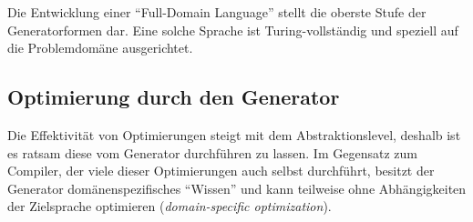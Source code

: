 Die Entwicklung einer \enquote{Full-Domain Language} stellt die oberste Stufe der Generatorformen dar. Eine solche Sprache ist Turing-vollständig und speziell auf die Problemdomäne ausgerichtet.

\subsection{Optimierung durch den Generator}

Die Effektivität von Optimierungen steigt mit dem Abstraktionslevel, deshalb ist es ratsam diese vom Generator durchführen zu lassen. Im Gegensatz zum Compiler, der viele dieser Optimierungen auch selbst durchführt, besitzt der Generator domänenspezifisches \enquote{Wissen} und kann teilweise ohne Abhängigkeiten der Zielsprache optimieren (\emph{domain-specific optimization}).



